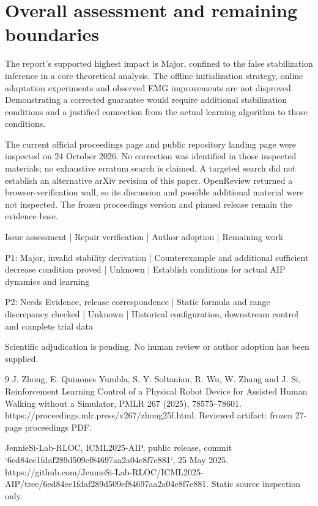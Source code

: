 \documentclass[10pt]{article}
\begin{document}
\section*{Overall assessment and remaining boundaries}
The report’s supported highest impact is Major, confined to the false stabilization inference in a core theoretical analysis. The offline initialization strategy, online adaptation experiments and observed EMG improvements are not disproved. Demonstrating a corrected guarantee would require additional stabilization conditions and a justified connection from the actual learning algorithm to those conditions.\par
The current official proceedings page and public repository landing page were inspected on 24 October 2026. No correction was identified in those inspected materials; no exhaustive erratum search is claimed. A targeted search did not establish an alternative arXiv revision of this paper. OpenReview returned a browser-verification wall, so its discussion and possible additional material were not inspected. The frozen proceedings version and pinned release remain the evidence base.\par
Issue assessment | Repair verification | Author adoption | Remaining work\par
P1: Major, invalid stability derivation | Counterexample and additional sufficient decrease condition proved | Unknown | Establish conditions for actual AIP dynamics and learning\par
P2: Needs Evidence, release correspondence | Static formula and range discrepancy checked | Unknown | Historical configuration, downstream control and complete trial data\par
Scientific adjudication is pending. No human review or author adoption has been supplied.\par
9 J. Zhong, E. Quinones Yumbla, S. Y. Soltanian, R. Wu, W. Zhang and J. Si, Reinforcement Learning Control of a Physical Robot Device for Assisted Human Walking without a Simulator, PMLR 267 (2025), 78575–78601. https://proceedings.mlr.press/v267/zhong25f.html. Reviewed artifact: frozen 27-page proceedings PDF.\par
JennieSi-Lab-RLOC, ICML2025-AIP, public release, commit `6ed84ee1fdaf289d509ef84697aa2a04e8f7e881`, 25 May 2025. https://github.com/JennieSi-Lab-RLOC/ICML2025-AIP/tree/6ed84ee1fdaf289d509ef84697aa2a04e8f7e881. Static source inspection only.\par
\end{document}

